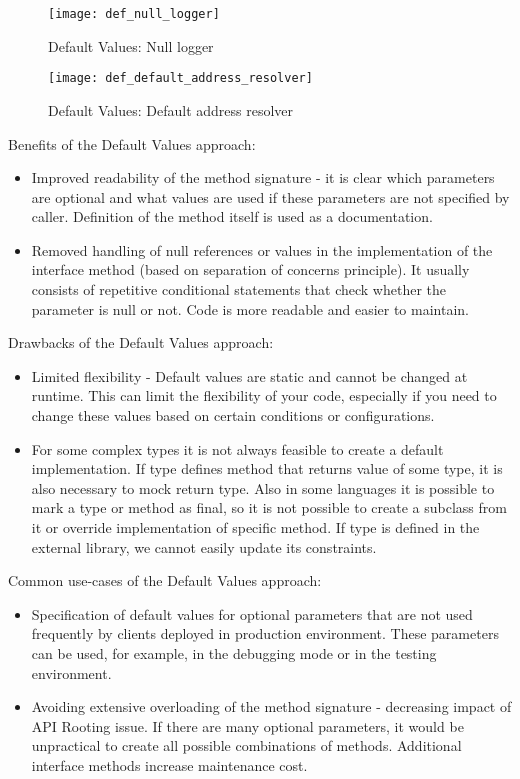 \begin{figure}[!htb]
    \centering
    \texttt{[image: def\_null\_logger]}
    \caption{Default Values: Null logger}
    \label{fig:def_null_logger}
\end{figure}

\begin{figure}[!htb]
    \centering
    \texttt{[image: def\_default\_address\_resolver]}
    \caption{Default Values: Default address resolver}
    \label{fig:def_default_address_resolver}
\end{figure}

Benefits of the Default Values approach:

\begin{itemize}
    \item Improved readability of the method signature - it is clear which parameters are optional and what values
    are used if these parameters are not specified by caller.
    Definition of the method itself is used as a documentation.
    \item Removed handling of null references or values in the implementation of the interface method
    (based on separation of concerns principle).
    It usually consists of repetitive conditional statements that check whether the parameter is null or not.
    Code is more readable and easier to maintain.
\end{itemize}

Drawbacks of the Default Values approach:

\begin{itemize}
    \item Limited flexibility - Default values are static and cannot be changed at runtime.
    This can limit the flexibility of your code, especially if you need to change these values based on certain
    conditions or configurations.
    \item For some complex types it is not always feasible to create a default implementation.
    If type defines method that returns value of some type, it is also necessary to mock return type.
    Also in some languages it is possible to mark a type or method as final, so it is not possible to create
    a subclass from it or override implementation of specific method.
    If type is defined in the external library, we cannot easily update its constraints.
\end{itemize}

Common use-cases of the Default Values approach:

\begin{itemize}
    \item Specification of default values for optional parameters that are not used frequently by clients
    deployed in production environment.
    These parameters can be used, for example, in the debugging mode or in the testing environment.
    \item Avoiding extensive overloading of the method signature - decreasing impact of API Rooting issue.
    If there are many optional parameters, it would be unpractical to create all possible combinations of methods.
    Additional interface methods increase maintenance cost.
\end{itemize}
